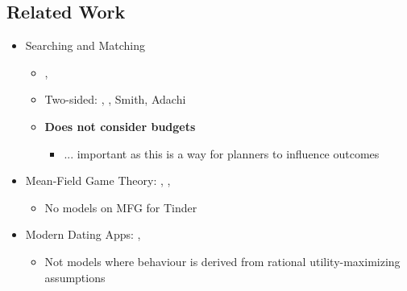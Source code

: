 \subsection{Related Work}
\begin{itemize}
    \item Searching and Matching
    \begin{itemize}
        \item \cite{gale_shapley_1962}, \cite{roth_sotomayor_1992}
        \item Two-sided: \cite{burdett1998two}, \cite{chade2006matching}, Smith, Adachi
        \item \textbf{Does not consider budgets}
        \begin{itemize}
            \item ... important as this is a way for planners to influence outcomes
        \end{itemize}
    \end{itemize}
    \item Mean-Field Game Theory: \cite{iyer2014mean}, \cite{gummadi2013optimal}, \cite{jovanovic1988anonymous}
    \begin{itemize}
        \item No models on MFG for Tinder
    \end{itemize} 
    \item Modern Dating Apps: \cite{olmeda2021towards}, \cite{kanoria2021facilitating}
    \begin{itemize}
        \item Not models where behaviour is derived from rational utility-maximizing assumptions 
    \end{itemize}
\end{itemize}